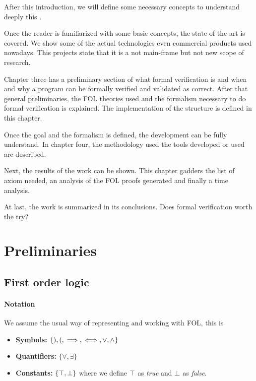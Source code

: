 After this introduction, we will define some necessary concepts to understand deeply this \thisworkm. 

Once the reader is familiarized with some basic concepts, the state of the art is covered. 
%
We show some of the actual technologies even commercial products used nowadays.
%
This projects state that it is a not main-frame but not new scope of research.

Chapter three has a preliminary section of what formal verification is and when and why a program can be formally verified and validated as correct. 
% 
After that general preliminaries, the \gls{FOL} theories used and the formalism necessary to do formal verification is explained.
%
The implementation of the structure is defined in this chapter.

Once the goal and the formalism is defined, the development can be fully understand. 
%
In chapter four, the methodology used the tools developed or used are described.

Next, the results of the work can be shown. 
%
This chapter gadders the list of axiom needed, an analysis of the \gls{FOL} proofs generated and finally a time analysis.

At last, the work is summarized in its conclusions. 
%
Does formal verification worth the try? 


\section{Preliminaries}

\subsection{First order logic}

\paragraph{Notation}
\label{def:notation}
We assume the usual way of representing and working with \gls{FOL}, this is
\begin{itemize}
	\item \textbf{Symbols:} $\{),(, \implies, \iff, \vee , \wedge \}$
	\item \textbf{Quantifiers:} $\{\forall, \exists\}$
	\item \textbf{Constants:} $\{\top,\perp\}$
	where we define $\top$ as \textit{true} and $\perp$ as \textit{false}.
\end{itemize}

